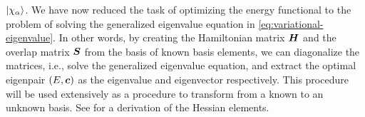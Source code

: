             $\ket{\chi_{\alpha}}$.
            We have now reduced the task of optimizing the energy functional to
            the problem of solving the generalized eigenvalue equation in
            \autoref{eq:variational-eigenvalue}.
            In other words, by creating the Hamiltonian matrix $\boldsymbol{H}$ and
            the overlap matrix $\boldsymbol{S}$ from the basis of known basis
            elements, we can diagonalize the matrices, i.e., solve the
            generalized eigenvalue equation, and extract the optimal eigenpair
            $(E, \boldsymbol{c})$ as the eigenvalue and eigenvector respectively.
            This procedure will be used extensively as a procedure to transform
            from a known to an unknown basis.
            See  \cite{helgaker-molecular} for a
            derivation of the Hessian elements.

